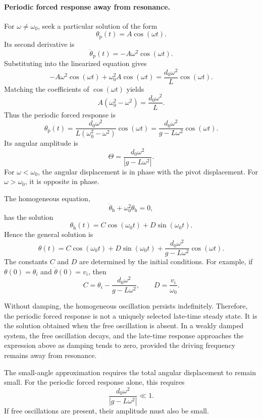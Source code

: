 \documentclass[12pt]{article}
\begin{document}
\paragraph{Periodic forced response away from resonance.}
For $\omega\neq\omega_0$, seek a particular solution of the form
\[
\theta_{\mathrm{p}}(t)=A\cos(\omega t).
\]
Its second derivative is
\[
\ddot{\theta}_{\mathrm{p}}(t)
=-A\omega^2\cos(\omega t).
\]
Substituting into the linearized equation gives
\[
-A\omega^2\cos(\omega t)
+\omega_0^2A\cos(\omega t)
=\frac{d_0\omega^2}{L}\cos(\omega t).
\]
Matching the coefficients of $\cos(\omega t)$ yields
\[
A(\omega_0^2-\omega^2)=\frac{d_0\omega^2}{L}.
\]
Thus the periodic forced response is
\[
\boxed{
\theta_{\mathrm{p}}(t)
=\frac{d_0\omega^2}{L(\omega_0^2-\omega^2)}
\cos(\omega t)
=\frac{d_0\omega^2}{g-L\omega^2}\cos(\omega t).
}
\]
Its angular amplitude is
\[
\Theta=\frac{d_0\omega^2}{|g-L\omega^2|}.
\]
For $\omega<\omega_0$, the angular displacement is in phase with the
pivot displacement. For $\omega>\omega_0$, it is opposite in phase.

The homogeneous equation,
\[
\ddot{\theta}_{\mathrm{h}}+\omega_0^2\theta_{\mathrm{h}}=0,
\]
has the solution
\[
\theta_{\mathrm{h}}(t)
=C\cos(\omega_0t)+D\sin(\omega_0t).
\]
Hence the general solution is
\[
\boxed{
\theta(t)
=C\cos(\omega_0t)+D\sin(\omega_0t)
+\frac{d_0\omega^2}{g-L\omega^2}\cos(\omega t).
}
\]
The constants $C$ and $D$ are determined by the initial conditions.
For example, if $\theta(0)=\theta_i$ and
$\dot{\theta}(0)=v_i$, then
\[
C=\theta_i-\frac{d_0\omega^2}{g-L\omega^2},
\qquad
D=\frac{v_i}{\omega_0}.
\]

Without damping, the homogeneous oscillation persists indefinitely.
Therefore, the periodic forced response is not a uniquely selected
late-time steady state. It is the solution obtained when the free
oscillation is absent. In a weakly damped system, the free oscillation
decays, and the late-time response approaches the expression above
as damping tends to zero, provided the driving frequency remains
away from resonance.

The small-angle approximation requires the total angular
displacement to remain small. For the periodic forced response alone,
this requires
\[
\boxed{
\frac{d_0\omega^2}{|g-L\omega^2|}\ll 1.
}
\]
If free oscillations are present, their amplitude must also be small.
\end{document}
